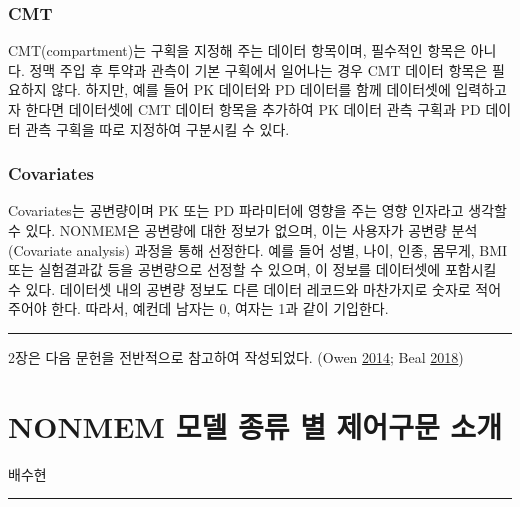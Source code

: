 \documentclass[
  11pt,
  krantz2,
  a4paper]{krantz}
\theoremstyle{definition}
\theoremstyle{definition}
\theoremstyle{definition}
\theoremstyle{remark}
\begin{document}
\hypertarget{cmt}{%
\subsection{CMT}\label{cmt}}


CMT(compartment)는 구획을 지정해 주는 데이터 항목이며, 필수적인 항목은 아니다. 정맥 주입 후 투약과 관측이 기본 구획에서 일어나는 경우 CMT 데이터 항목은 필요하지 않다. 하지만, 예를 들어 PK 데이터와 PD 데이터를 함께 데이터셋에 입력하고자 한다면 데이터셋에 CMT 데이터 항목을 추가하여 PK 데이터 관측 구획과 PD 데이터 관측 구획을 따로 지정하여 구분시킬 수 있다.

\hypertarget{covariates}{%
\subsection{Covariates}\label{covariates}}

Covariates는 공변량이며 PK 또는 PD 파라미터에 영향을 주는 영향 인자라고 생각할 수 있다. NONMEM은 공변량에 대한 정보가 없으며, 이는 사용자가 공변량 분석(Covariate analysis) 과정을 통해 선정한다. 예를 들어 성별, 나이, 인종, 몸무게, BMI 또는 실험결과값 등을 공변량으로 선정할 수 있으며, 이 정보를 데이터셋에 포함시킬 수 있다. 데이터셋 내의 공변량 정보도 다른 데이터 레코드와 마찬가지로 숫자로 적어주어야 한다. 따라서, 예컨데 남자는 0, 여자는 1과 같이 기입한다.

\begin{center}\rule{0.5\linewidth}{0.5pt}\end{center}

2장은 다음 문헌을 전반적으로 참고하여 작성되었다. (Owen \protect\hyperlink{ref-kelly}{2014}; Beal \protect\hyperlink{ref-nonmem}{2018})

\hypertarget{control-stream}{%
\chapter{NONMEM 모델 종류 별 제어구문 소개}\label{control-stream}}

\Large\hfill

배수현
\normalsize

\begin{center}\rule{0.5\linewidth}{0.5pt}\end{center}
\end{document}
